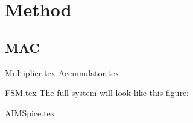 \section{Method}
\subsection{MAC} 
{Multiplier.tex}
{Accumulator.tex}


{FSM.tex}
The full system will look like this figure: 

{AIMSpice.tex}

